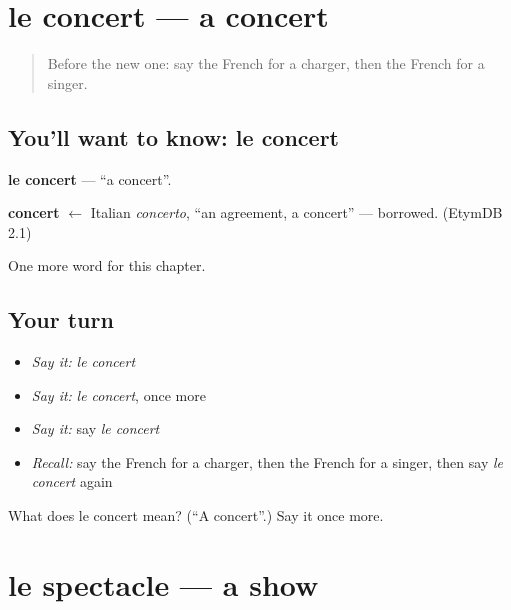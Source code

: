 \section[le concert]{le concert — a concert}

\label{lesson:FR-C223-concert}



\begin{quote}
Before the new one: say the French for a charger, then the French for a singer.
\end{quote}

\subsection*{You'll want to know: le concert}
\textbf{le concert} — \textquotedblleft{}a concert\textquotedblright{}.

\begin{cousinweb}
\textbf{concert} $\leftarrow$ Italian \emph{concerto}, \textquotedblleft{}an agreement, a concert\textquotedblright{} — borrowed. (EtymDB 2.1)
\end{cousinweb}

\begin{grammarlens}[title={What you've built}]
One more word for this chapter.
\end{grammarlens}

\subsection*{Your turn}
\begin{itemize}
\raggedright
  \item \emph{Say it:} \emph{le concert}
  \item \emph{Say it:} \emph{le concert}, once more
  \item \emph{Say it:} say \emph{le concert}
  \item \emph{Recall:} say the French for a charger, then the French for a singer, then say \emph{le concert} again
\end{itemize}

\begin{tcolorbox}[breakable,colback=teal!4,colframe=teal!35!black,title={Before you move on}]
What does le concert mean? (\textquotedblleft{}A concert\textquotedblright{}.) Say it once more.
\end{tcolorbox}
\section[le spectacle]{le spectacle — a show}

